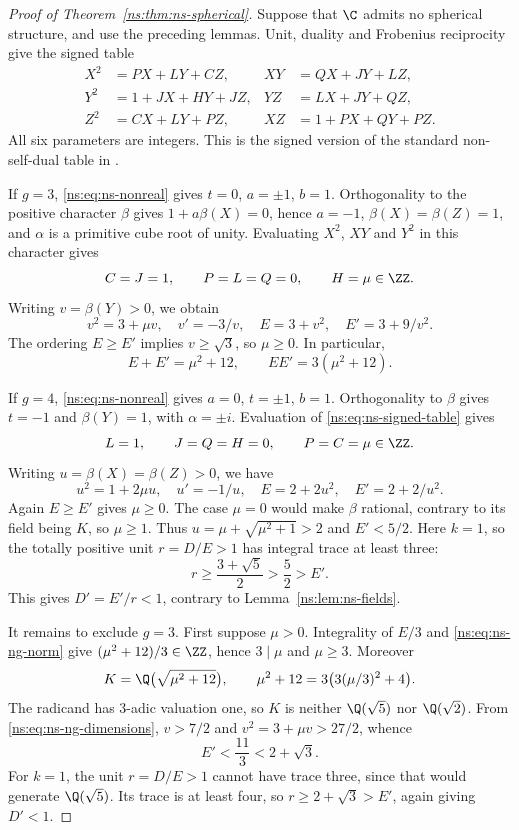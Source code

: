 \begin{proof}[Proof of Theorem~\ref{ns:thm:ns-spherical}]
Suppose that $\C$ admits no spherical structure, and use the preceding
lemmas. Unit, duality and Frobenius reciprocity give the signed table
\begin{equation}\label{ns:eq:ns-signed-table}
\begin{aligned}
 X^2&=P X+L Y+C Z,& XY&=Q X+J Y+L Z,\\
 Y^2&=1+J X+H Y+J Z,& YZ&=L X+J Y+Q Z,\\
 Z^2&=C X+L Y+P Z,& XZ&=1+P X+Q Y+P Z.
\end{aligned}
\end{equation}
All six parameters are integers. This is the signed version of the
standard non-self-dual table in \cite[Proposition~2.1]{Larson}.

If $g=3$, \eqref{ns:eq:ns-nonreal} gives $t=0$, $a=\pm1$, $b=1$.
Orthogonality to the positive character $\beta$ gives
$1+a\beta(X)=0$, hence $a=-1$, $\beta(X)=\beta(Z)=1$, and
$\alpha$ is a primitive cube root of unity. Evaluating
$X^2$, $XY$ and $Y^2$ in this character gives
\[
 C=J=1,\qquad P=L=Q=0,\qquad H=\mu\in\ZZ.
\]
Writing $v=\beta(Y)>0$, we obtain
\begin{equation}\label{ns:eq:ns-ng-dimensions}
 v^2=3+\mu v,\quad v'=-3/v,\quad
 E=3+v^2,\quad E'=3+9/v^2.
\end{equation}
The ordering $E\geq E'$ implies $v\geq\sqrt3$, so $\mu\geq0$.
In particular,
\begin{equation}\label{ns:eq:ns-ng-norm}
 E+E'=\mu^2+12,\qquad EE'=3(\mu^2+12).
\end{equation}

If $g=4$, \eqref{ns:eq:ns-nonreal} gives $a=0$, $t=\pm1$, $b=1$.
Orthogonality to $\beta$ gives $t=-1$ and $\beta(Y)=1$, with
$\alpha=\pm i$. Evaluation of \eqref{ns:eq:ns-signed-table} gives
\[
 L=1,\qquad J=Q=H=0,\qquad P=C=\mu\in\ZZ.
\]
Writing $u=\beta(X)=\beta(Z)>0$, we have
\[
 u^2=1+2\mu u,\quad u'=-1/u,\quad
 E=2+2u^2,\quad E'=2+2/u^2.
\]
Again $E\geq E'$ gives $\mu\geq0$. The case $\mu=0$ would make
$\beta$ rational, contrary to its field being $K$, so $\mu\geq1$.
Thus $u=\mu+\sqrt{\mu^2+1}>2$ and $E'<5/2$. Here $k=1$, so the
totally positive unit $r=D/E>1$ has integral trace at least three:
\[
 r\geq\frac{3+\sqrt5}{2}>\frac52>E'.
\]
This gives $D'=E'/r<1$, contrary to Lemma~\ref{ns:lem:ns-fields}.

It remains to exclude $g=3$. First suppose $\mu>0$. Integrality of
$E/3$ and \eqref{ns:eq:ns-ng-norm} give
$(\mu^2+12)/3\in\ZZ$, hence $3\mid\mu$ and $\mu\geq3$.
Moreover
\[
 K=\Q\bigl(\sqrt{\mu^2+12}\bigr),\qquad
 \mu^2+12=3\bigl(3(\mu/3)^2+4\bigr).
\]
The radicand has $3$-adic valuation one, so $K$ is neither
$\Q(\sqrt5)$ nor $\Q(\sqrt2)$.
From \eqref{ns:eq:ns-ng-dimensions}, $v>7/2$ and
$v^2=3+\mu v>27/2$, whence
\begin{equation}\label{ns:eq:ns-small-conjugate}
 E'<\frac{11}{3}<2+\sqrt3.
\end{equation}
For $k=1$, the unit $r=D/E>1$ cannot have trace three, since that
would generate $\Q(\sqrt5)$. Its trace is at least four,
so $r\geq2+\sqrt3>E'$, again giving $D'<1$.


\end{proof}
